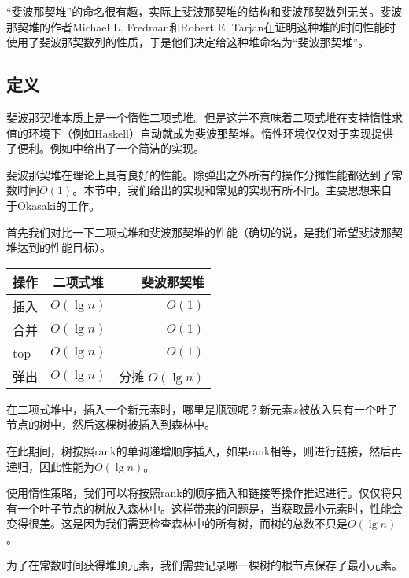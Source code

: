 \documentclass[UTF8]{article}
\begin{document}
“斐波那契堆”的命名很有趣，实际上斐波那契堆的结构和斐波那契数列无关。斐波那契堆的作者Michael L. Fredman和Robert E. Tarjan在证明这种堆的时间性能时使用了斐波那契数列的性质，于是他们决定给这种堆命名为“斐波那契堆”\cite{CLRS}。

\subsection{定义}

斐波那契堆本质上是一个惰性二项式堆。但是这并不意味着二项式堆在支持惰性求值的环境下（例如Haskell）自动就成为斐波那契堆。惰性环境仅仅对于实现提供了便利。例如\cite{hackage-fibq}中给出了一个简洁的实现。

斐波那契堆在理论上具有良好的性能。除弹出之外所有的操作分摊性能都达到了常数时间$O(1)$。本节中，我们给出的实现和常见的实现\cite{CLRS}有所不同。主要思想来自于Okasaki的工作\cite{okasaki-fibh}。

首先我们对比一下二项式堆和斐波那契堆的性能（确切的说，是我们希望斐波那契堆达到的性能目标）。

\begin{tabular}{l | c | r}
  \hline
  操作 & 二项式堆 & 斐波那契堆 \\
  \hline
  插入 & $O(\lg n)$ & $O(1)$ \\
  合并 & $O(\lg n)$ & $O(1)$ \\
  top & $O(\lg n)$ & $O(1)$ \\
  弹出 & $O(\lg n)$ & 分摊 $O(\lg n)$ \\
  \hline
\end{tabular}

在二项式堆中，插入一个新元素时，哪里是瓶颈呢？新元素$x$被放入只有一个叶子节点的树中，然后这棵树被插入到森林中。

在此期间，树按照rank的单调递增顺序插入，如果rank相等，则进行链接，然后再递归，因此性能为$O(\lg n)$。

使用惰性策略，我们可以将按照rank的顺序插入和链接等操作推迟进行。仅仅将只有一个叶子节点的树放入森林中。这样带来的问题是，当获取最小元素时，性能会变得很差。这是因为我们需要检查森林中的所有树，而树的总数不只是$O(\lg n)$。

为了在常数时间获得堆顶元素，我们需要记录哪一棵树的根节点保存了最小元素。
\end{document}
